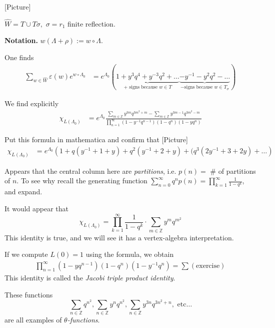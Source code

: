 [Picture]

$\hat{W}=T \cup  T\sigma,$ $\sigma=r_1$
finite reflection.

\medskip\noindent
{\bf Notation.} $w(\Lambda+\rho):=w \circ
\Lambda.$

One finds
$$
\begin{aligned}
\sum_{w \in \widehat{W}}\varepsilon(w)e^{w
\circ \Lambda_0}&=
e^{\Lambda_0}\left(
\underbrace{1+y^3q^4+y^{-3}q^2+\ldots}
_{\text{+
signs because $w \in T$}}
\underbrace{-y^{-1}-y^2q^2-\ldots}_{\text{$-$
signs because $w \in T_\sigma$}}
\right)
\end{aligned}
$$

We find explicitly
$$
\begin{aligned}
\chi_{L(\Lambda_0)}&=e^{\Lambda_0}
\frac{\sum_{m \in \mathbb{Z}}
y^{3m}q^{3m^2+m}-\sum_{m \in \mathbb{Z}}
y^{3m-1}q^{3m^2-m}}
{\prod_{n=1}^\infty(1-y^{-1}q^{n-1})(1-q^n)
(1-yq^n)}
\end{aligned}
$$

\begin{exercise}
\label{exercise-mathematica}
Put this formula in mathematica and confirm
that [Picture]
$$
\begin{aligned}
\chi_{L(\Lambda_0)}&=e^{\Lambda_0}
\left(1+q(y^{-1}+1+y)+q^2(y^{-1}+2+y)
+(q^3(2y^{-1}+3+2y)+\ldots\right)
\end{aligned}
$$
\end{exercise}

Appears that the central column here are {\it
partitions}, i.e.
$p(n)=$ \# of partitions of $n$. To see why
recall the generating function
$\sum_{n=0}^\infty
q^np(n)=\prod_{k=1}^\infty\frac{1}{1-q^k}$,
and expand.

It would appear that
$$
\chi_{L(\Lambda_0)}=
\prod_{k=1}^\infty\frac{1}{1-q^k}\cdot
\sum_{m \in \mathbb{Z}}y^mq^{m^2}
$$
This identity is true, and we will see it has
a vertex-algebra interpretation.

\begin{remark}
\label{remark-Jacobi-triple-product-identity}
If we compute $L(0)=1$ using the formula, we
obtain
$$
\begin{aligned}
\prod_{n=1}^\infty(1-yq^{n-1})(1-q^n)(1-y^{-
1}q^n)=\sum(\text{exercise})
\end{aligned}
$$
This identity is called the {\it Jacobi
triple product identity}.
\end{remark}

These functions
$$
\sum_{n \in \mathbb{Z}}q^{n^2}, \sum_{n \in
\mathbb{Z}}y^n q^{n^2},
\sum_{n \in
\mathbb{Z}}y^{3n}q^{3n^2+n},\text{ etc…}
$$
are all examples of {\it $\theta$-functions}.

